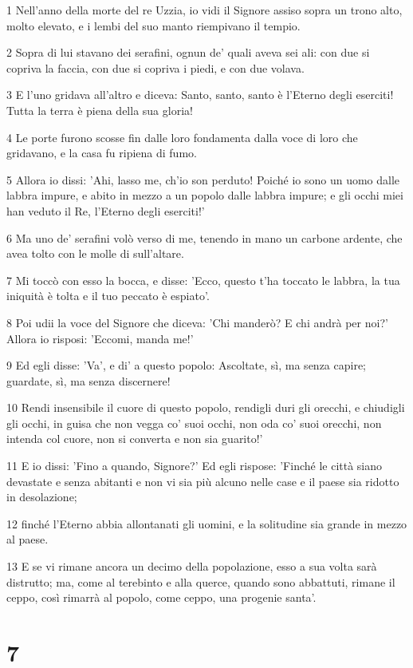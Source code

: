 \par 1 Nell'anno della morte del re Uzzia, io vidi il Signore assiso sopra un trono alto, molto elevato, e i lembi del suo manto riempivano il tempio.
\par 2 Sopra di lui stavano dei serafini, ognun de' quali aveva sei ali: con due si copriva la faccia, con due si copriva i piedi, e con due volava.
\par 3 E l'uno gridava all'altro e diceva: Santo, santo, santo è l'Eterno degli eserciti! Tutta la terra è piena della sua gloria!
\par 4 Le porte furono scosse fin dalle loro fondamenta dalla voce di loro che gridavano, e la casa fu ripiena di fumo.
\par 5 Allora io dissi: 'Ahi, lasso me, ch'io son perduto! Poiché io sono un uomo dalle labbra impure, e abito in mezzo a un popolo dalle labbra impure; e gli occhi miei han veduto il Re, l'Eterno degli eserciti!'
\par 6 Ma uno de' serafini volò verso di me, tenendo in mano un carbone ardente, che avea tolto con le molle di sull'altare.
\par 7 Mi toccò con esso la bocca, e disse: 'Ecco, questo t'ha toccato le labbra, la tua iniquità è tolta e il tuo peccato è espiato'.
\par 8 Poi udii la voce del Signore che diceva: 'Chi manderò? E chi andrà per noi?' Allora io risposi: 'Eccomi, manda me!'
\par 9 Ed egli disse: 'Va', e di' a questo popolo: Ascoltate, sì, ma senza capire; guardate, sì, ma senza discernere!
\par 10 Rendi insensibile il cuore di questo popolo, rendigli duri gli orecchi, e chiudigli gli occhi, in guisa che non vegga co' suoi occhi, non oda co' suoi orecchi, non intenda col cuore, non si converta e non sia guarito!'
\par 11 E io dissi: 'Fino a quando, Signore?' Ed egli rispose: 'Finché le città siano devastate e senza abitanti e non vi sia più alcuno nelle case e il paese sia ridotto in desolazione;
\par 12 finché l'Eterno abbia allontanati gli uomini, e la solitudine sia grande in mezzo al paese.
\par 13 E se vi rimane ancora un decimo della popolazione, esso a sua volta sarà distrutto; ma, come al terebinto e alla querce, quando sono abbattuti, rimane il ceppo, così rimarrà al popolo, come ceppo, una progenie santa'.

\chapter{7}

